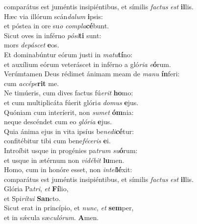 \evenverse comparátus est juméntis insipiéntibus, et símilis \textit{fa}\textit{ctus} \textit{est} \textbf{il}lis.\\
\oddverse Hæc via illórum scán\textit{da}\textit{lum} \textbf{i}psis:~\*\\
\oddverse et póstea in ore su\textit{o} \textit{com}\textit{pla}\textbf{cé}bunt.\\
\evenverse Sicut oves in inférno \textit{pó}\textit{si}\textbf{ti} sunt:~\*\\
\evenverse mors \textit{de}\textit{pá}\textit{scet} \textbf{e}os.\\
\oddverse Et dominabúntur eórum justi in \textit{ma}\textit{tu}\textbf{tí}no:~\*\\
\oddverse et auxílium eórum veteráscet in inférno a gló\textit{ri}\textit{a} \textit{e}\textbf{ó}rum.\\
\evenverse Verúmtamen Deus rédimet ánimam meam de \textit{ma}\textit{nu} \textbf{ín}feri:~\*\\
\evenverse cum \textit{ac}\textit{cé}\textit{pe}\textbf{rit} me.\\
\oddverse Ne timúeris, cum dives factus fú\textit{e}\textit{rit} \textbf{ho}mo:~\*\\
\oddverse et cum multiplicáta fúerit glóri\textit{a} \textit{do}\textit{mus} \textbf{e}jus.\\
\evenverse Quóniam cum interíerit, non \textit{su}\textit{met} \textbf{óm}nia:~\*\\
\evenverse neque descéndet cum eo \textit{gló}\textit{ri}\textit{a} \textbf{e}jus.\\
\oddverse Quia ánima ejus in vita ipsíus be\textit{ne}\textit{di}\textbf{cé}tur:~\*\\
\oddverse confitébitur tibi cum bene\textit{fé}\textit{ce}\textit{ris} \textbf{e}i.\\
\evenverse Introíbit usque in progénies pa\textit{trum} \textit{su}\textbf{ó}rum:~\*\\
\evenverse et usque in ætérnum non \textit{vi}\textit{dé}\textit{bit} \textbf{lu}men.\\
\oddverse Homo, cum in honóre esset, non \textit{in}\textit{tel}\textbf{lé}xit:~\*\\
\oddverse comparátus est juméntis insipiéntibus, et símilis \textit{fa}\textit{ctus} \textit{est} \textbf{il}lis.\\
\evenverse Glória Pa\textit{tri}, \textit{et} \textbf{Fí}lio,~\*\\
\evenverse et Spi\textit{rí}\textit{tu}\textit{i} \textbf{San}cto.\\
\oddverse Sicut erat in princípio, et \textit{nunc}, \textit{et} \textbf{sem}per,~\*\\
\oddverse et in sǽcula sæ\textit{cu}\textit{ló}\textit{rum}. \textbf{A}men.\\
